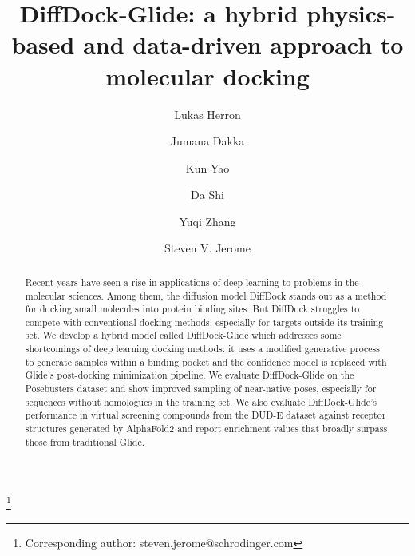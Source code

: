 \documentclass[%
 aip,
 amsmath,amssymb,
reprint,%
]{revtex4-1}
\begin{document}
\title{DiffDock-Glide: a hybrid physics-based and data-driven approach to molecular docking}



\author{Lukas Herron}

\author{Jumana Dakka}
\author{Kun Yao}
\author{Da Shi}
\author{Yuqi Zhang}
\author{Steven V. Jerome}
\thanks{Corresponding author: steven.jerome@schrodinger.com}


\begin{abstract}
Recent years have seen a rise in applications of deep learning to problems in the molecular sciences. Among them, the diffusion model DiffDock stands out as a method for docking small molecules into protein binding sites. But DiffDock struggles to compete with conventional docking methods, especially for targets outside its training set. We develop a hybrid model called DiffDock-Glide which addresses some shortcomings of deep learning docking methods: it uses a modified generative process to generate samples within a binding pocket and the confidence model is replaced with Glide's post-docking minimization pipeline. We evaluate DiffDock-Glide on the Posebusters dataset and show improved sampling of near-native poses, especially for sequences without homologues in the training set. We also evaluate DiffDock-Glide's performance in virtual screening compounds from the DUD-E dataset against receptor structures generated by AlphaFold2 and report enrichment values that broadly surpass those from traditional Glide.

\end{abstract}

\maketitle
\end{document}
